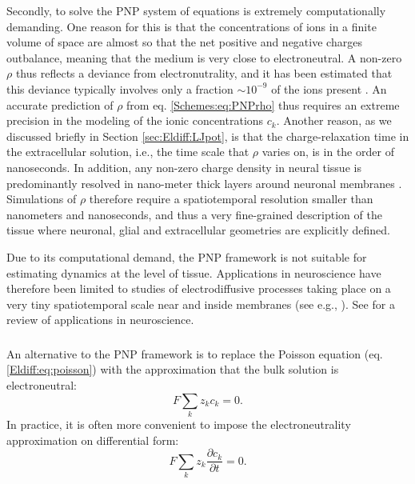 Secondly, to solve the PNP system of equations is extremely computationally demanding. One reason for this is that the concentrations of ions in a finite volume of space are almost so that the net positive and negative charges outbalance, meaning that the medium is very close to electroneutral. A non-zero $\rho$ thus reflects a deviance from electronutrality, and it has been estimated that this deviance typically involves only a fraction $\sim 10^{-9}$ of the ions present \cite{Aguilella1986}. An accurate prediction of $\rho$ from eq. \ref{Schemes:eq:PNPrho} thus requires an extreme precision in the modeling of the ionic concentrations $c_k$. Another reason, as we discussed briefly in Section \ref{sec:Eldiff:LJpot}, is that the charge-relaxation time in the extracellular solution, i.e., the time scale that $\rho$ varies on, is in the order of nanoseconds. In addition, any non-zero charge density in neural tissue is predominantly resolved in nano-meter thick layers around neuronal membranes \cite{Grodzinsky2011, Gratiy2017}. Simulations of $\rho$ therefore require a spatiotemporal resolution smaller than nanometers and nanoseconds, and thus a very fine-grained description of the tissue where neuronal, glial and extracellular geometries are explicitly defined.

Due to its computational demand, the PNP framework is not suitable for estimating dynamics at the level of tissue. Applications in neuroscience have therefore been limited to studies of electrodiffusive processes taking place on a very tiny spatiotemporal scale near and inside membranes (see e.g., \cite{Leonetti2004, Lu2007, Lopreore2008, Nanninga2008, Gardner2011, Zheng2011, Pods2013, Gardner2015}). See \cite{Savtchenko2017} for a review of applications in neuroscience.

\subsubsection{}
\label{sec:Schemes:electroneutral}

An alternative to the PNP framework is to replace the Poisson equation (eq. \ref{Eldiff:eq:poisson}) with the approximation that the bulk solution is electroneutral:
\begin{equation}
F \sum_k z_k c_k = 0.
\label{Schemes:eq:electroneutral}
\end{equation}
In practice, it is often more convenient to impose the electroneutrality approximation on differential form:
\begin{equation}
F \sum_k{z_k \frac{\partial c_k}{\partial t}} = 0.
\label{Schemes:eq:electroneutral2}
\end{equation}

